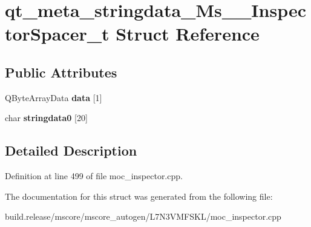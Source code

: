 \hypertarget{structqt__meta__stringdata___ms_____inspector_spacer__t}{}\section{qt\+\_\+meta\+\_\+stringdata\+\_\+\+Ms\+\_\+\+\_\+\+Inspector\+Spacer\+\_\+t Struct Reference}
\label{structqt__meta__stringdata___ms_____inspector_spacer__t}
\subsection*{Public Attributes}
\begin{DoxyCompactItemize}
\item 
\mbox{\label{structqt__meta__stringdata___ms_____inspector_spacer__t_a4b2afb13fb058d5ad5d7d47e5214fdb0}} 
Q\+Byte\+Array\+Data {\bfseries data} \mbox{[}1\mbox{]}
\item 
\mbox{\label{structqt__meta__stringdata___ms_____inspector_spacer__t_a6927fab8d4380e25e4adecb8d83f6f64}} 
char {\bfseries stringdata0} \mbox{[}20\mbox{]}
\end{DoxyCompactItemize}


\subsection{Detailed Description}


Definition at line 499 of file moc\+\_\+inspector.\+cpp.



The documentation for this struct was generated from the following file\+:\begin{DoxyCompactItemize}
\item 
build.\+release/mscore/mscore\+\_\+autogen/\+L7\+N3\+V\+M\+F\+S\+K\+L/moc\+\_\+inspector.\+cpp\end{DoxyCompactItemize}
